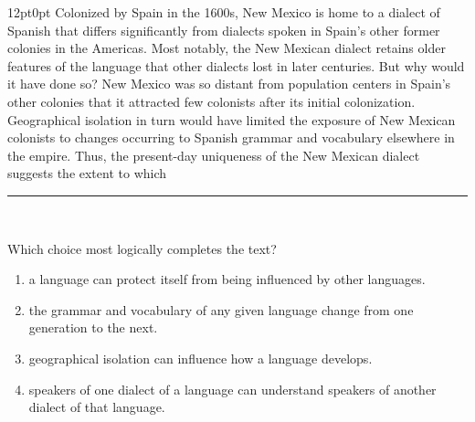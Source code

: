 \documentclass[11pt, twocolumn]{article}
\newcounter{questionnum}
\begin{document}
\vspace{6pt}\noindent
\begin{minipage}{\columnwidth}\raggedright
\noindent{}\par\vspace{8pt}
\begin{adjustwidth}{12pt}{0pt}
Colonized by Spain in the 1600s, New Mexico is home to a dialect of Spanish that differs significantly from dialects spoken in Spain's other former colonies in the Americas. Most notably, the New Mexican dialect retains older features of the language that other dialects lost in later centuries. But why would it have done so? New Mexico was so distant from population centers in Spain's other colonies that it attracted few colonists after its initial colonization. Geographical isolation in turn would have limited the exposure of New Mexican colonists to changes occurring to Spanish grammar and vocabulary elsewhere in the empire. Thus, the present-day uniqueness of the New Mexican dialect suggests the extent to which \,\rule{2cm}{0.4pt}\,
\vspace{6pt}

Which choice most logically completes the text?
\begin{enumerate}[label=\Alph*),leftmargin=18pt,topsep=3pt,itemsep=2pt]
  \item a language can protect itself from being influenced by other languages.
  \item the grammar and vocabulary of any given language change from one generation to the next.
  \item geographical isolation can influence how a language develops.
  \item speakers of one dialect of a language can understand speakers of another dialect of that language.
\end{enumerate}
\end{adjustwidth}
\end{minipage}\par
\end{document}
